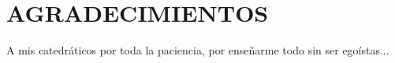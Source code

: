 \chapter*{AGRADECIMIENTOS}
A mis catedráticos por toda la paciencia, por enseñarme todo sin ser egoístas...
\thispagestyle{empty}

% 